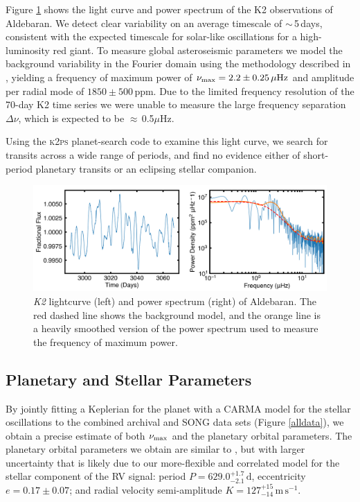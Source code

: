 \documentclass[modern]{aastex61}
\newcommand{\numax}{\mbox{$\nu_{\rm max}$}\xspace}
\newcommand{\Dnu}{\mbox{$\Delta \nu$}\xspace}
\newcommand{\muHz}{\mbox{$\mu$Hz}\xspace}
\newcommand{\ktwo}{\emph{K2}\xspace}
\newcommand{\twosidedrange}[3]{\ensuremath{#1^{+#2}_{-#3}}}
\newcommand{\PeriodRange}{\twosidedrange{629.0}{1.7}{2.1}}
\newcommand{\EccentricityRange}{0.17\pm0.07} %
\newcommand{\PlanetRVAmpRange}{\twosidedrange{127}{15}{14}}
\begin{document}
Figure \ref{k2_lightcurve} shows the light curve and power spectrum of the K2 observations of Aldebaran. We detect clear variability on an average timescale of $\sim$\,5\,days, consistent with the expected timescale for solar-like oscillations for a high-luminosity red giant. To measure global asteroseismic parameters we model the background variability in the Fourier domain using the methodology described in \citet{huber09}, yielding a frequency of maximum power of $\numax = 2.2 \pm 0.25\,\muHz$ and amplitude per radial mode of $1850 \pm 500$\,ppm. Due to the limited frequency resolution of the 70-day K2 time series we were unable to measure the large frequency separation \Dnu, which is expected to be $\approx$\,0.5\muHz.

Using the \textsc{k2ps} planet-search code \citep{k2ps,Pope2016} to examine this light curve, we search for transits across a wide range of periods, and find no evidence either of short-period planetary transits or an eclipsing stellar companion.

\begin{figure}
\centering
\includegraphics[width=\textwidth]{k2obs.png}
\caption{\ktwo lightcurve (left) and power spectrum (right) of Aldebaran. The red dashed line shows the background model, and the orange line is a heavily smoothed version of the power spectrum used to measure the frequency of maximum power. }
\label{k2_lightcurve}
\end{figure}

\subsection{Planetary and Stellar Parameters}
\label{sec:planet-star-parameters}

By jointly fitting a Keplerian for the planet with a CARMA model for the stellar
oscillations to the combined archival and SONG data sets (Figure \ref{alldata}),
we obtain a precise estimate of both \numax and the planetary orbital
parameters. The planetary orbital parameters we obtain are similar to
\citet{Hatzes2015}, but with larger uncertainty that is likely due to our
more-flexible and correlated model for the stellar component of the RV signal:
period $P = \PeriodRange{} \, \mathrm{d}$,  eccentricity $e =
\EccentricityRange{}$; and radial velocity semi-amplitude $K =
\PlanetRVAmpRange{} \, \mathrm{m}\, \mathrm{s}^{-1}$.
\end{document}
